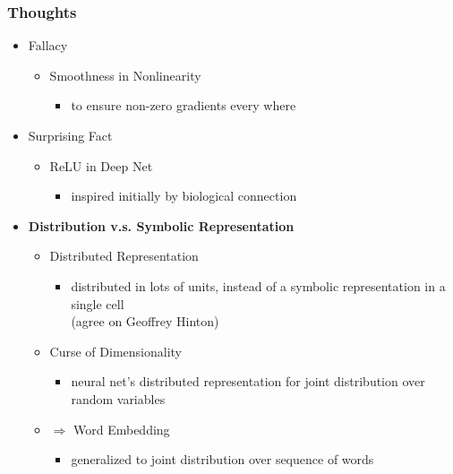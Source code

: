 \subsubsection{Thoughts}
\begin{itemize}
\item Fallacy
	\begin{itemize}
	\item Smoothness in Nonlinearity
		\begin{itemize}
		\item to ensure non-zero gradients every where
		\end{itemize}
	\end{itemize}
\item Surprising Fact
	\begin{itemize}
	\item ReLU in Deep Net
		\begin{itemize}
		\item inspired initially by biological connection
		\end{itemize}
	\end{itemize}
\item \textbf{Distribution v.s. Symbolic Representation}
	\begin{itemize}
	\item Distributed Representation 
		\begin{itemize}
		\item distributed in lots of units, instead of a symbolic representation in a single cell \\
		(agree on Geoffrey Hinton)
		\end{itemize}
	\item Curse of Dimensionality
		\begin{itemize}
		\item neural net's distributed representation for joint distribution over random variables
		\end{itemize}
	\item $\Rightarrow$ Word Embedding
		\begin{itemize}
		\item generalized to joint distribution over sequence of words
		\end{itemize}
	\end{itemize}
\end{itemize}

